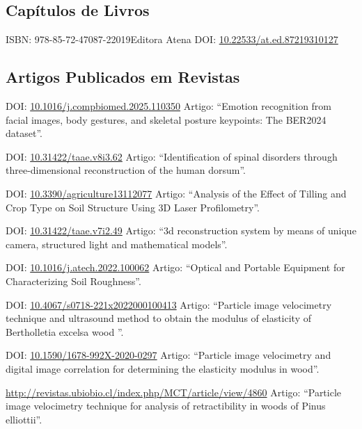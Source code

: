 \documentclass[11pt,a4paper,sans]{moderncv} %
\newcommand{\doiurl}[1]{\href{https://doi.org/#1}{#1}}
\begin{document}
\subsection{Capítulos de Livros}
	      {ISBN: 978-85-72-47087-2}{2019}{Editora Atena}
	      {DOI: \doiurl{10.22533/at.ed.87219310127}}

\subsection{Artigos Publicados em Revistas}

	      {DOI: \doiurl{10.1016/j.compbiomed.2025.110350} }{}{}
	      {Artigo: ``Emotion recognition from facial images, body gestures, and skeletal posture keypoints: The BER2024 dataset''.}
	      
	      {DOI: \doiurl{10.31422/taae.v8i3.62} }{}{}
	      {Artigo: ``Identification of spinal disorders through three-dimensional reconstruction of the human dorsum''.}
	      

	      
	      {DOI: \doiurl{10.3390/agriculture13112077} }{}{}
	      {Artigo: ``Analysis of the Effect of Tilling and Crop Type on Soil Structure Using 3D Laser Profilometry''.}
	      
	      {DOI: \doiurl{10.31422/taae.v7i2.49} }{}{}
	      {Artigo: ``3d reconstruction system by means of unique camera, structured light and mathematical models''.}

	      {DOI: \doiurl{10.1016/j.atech.2022.100062} }{}{}
	      {Artigo: ``Optical and Portable Equipment for Characterizing Soil Roughness''.}
	      
	      {DOI: \doiurl{10.4067/s0718-221x2022000100413} }{}{}
	      {Artigo: ``Particle image velocimetry technique and ultrasound method to obtain the modulus of elasticity of Bertholletia excelsa wood ''.}
	      
	      {DOI: \doiurl{10.1590/1678-992X-2020-0297} }{}{}
	      {Artigo: ``Particle image velocimetry and digital image correlation for determining the elasticity modulus in wood''.}
	      
	      {\url{http://revistas.ubiobio.cl/index.php/MCT/article/view/4860}}{}{}
	      {Artigo: ``Particle image velocimetry technique for analysis of retractibility in woods of Pinus elliottii''.}
	      
\end{document}
